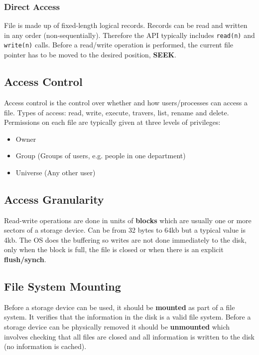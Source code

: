 \documentclass{article}%
\begin{document}
\subsubsection{Direct Access}
\label{sec:orgceaf9a5}
File is made up of fixed-length logical records.
Records can be read and written in any order (non-sequentially).
Therefore the API typically includes \texttt{read(n)} and \texttt{write(n)} calls.
Before a read/write operation is performed, the current file pointer has to be moved to the desired position, \textbf{SEEK}.

\subsection{Access Control}
\label{sec:org23fbce2}
Access control is the control over whether and how users/processes can access a file.
Types of access: read, write, execute, travers, list, rename and delete.
Permissions on each file are typically given at three levels of privileges:
\begin{itemize}
\item Owner
\item Group (Groups of users, e.g. people in one department)
\item Universe (Any other user)
\end{itemize}

\subsection{Access Granularity}
\label{sec:org5d6820c}
Read-write operations are done in units of \textbf{blocks} which are usually one or more sectors of a storage device.
Can be from 32 bytes to 64kb but a typical value is 4kb.
The OS does the buffering so writes are not done immediately to the disk, only when the block is full, the file is closed or when there is an explicit \textbf{flush/synch}.

\subsection{File System Mounting}
\label{sec:orgff48395}
Before a storage device can be used, it should be \textbf{mounted} as part of a file system.
It verifies that the information in the disk is a valid file system.
Before a storage device can be physically removed it should be \textbf{unmounted} which involves checking that all files are closed and all information is written to the disk (no information is cached).
\end{document}
